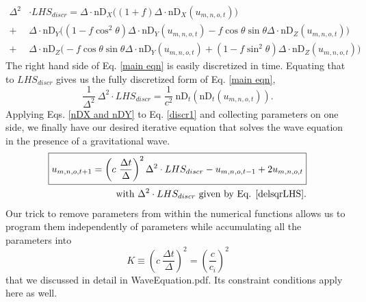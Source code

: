 \documentclass{article}
\begin{document}
\begin{align} \label{delsqrLHS}
\Delta^2 &\cdot LHS_{discr} = \Delta\cdot\mbox{nD}_X\big((1+f)\Delta\cdot\mbox{nD}_X(u_{m,n,o,t})\big) \\
+&\Delta \cdot\mbox{nD}_Y\big((1-f\cos^2\theta)\Delta\cdot\mbox{nD}_Y(u_{m,n,o,t})-f\cos\theta\sin\theta\Delta\cdot\mbox{nD}_Z(u_{m,n,o,t}) \big) \nonumber \\
+&\Delta \cdot\mbox{nD}_Z\big(-f\cos\theta\sin\theta\Delta\cdot\mbox{nD}_Y(u_{m,n,o,t}) + (1-f\sin^2\theta)\Delta\cdot\mbox{nD}_Z(u_{m,n,o,t})\big) \nonumber
\end{align}
The right hand side of Eq. \ref{main eqn} is easily discretized in time. Equating that to $LHS_{discr}$ gives us the fully discretized form of Eq. \ref{main eqn},
\begin{equation} \label{discr1}
\frac{1}{\Delta^2}\ \Delta^2 \cdot LHS_{discr} = \frac{1}{c^2}\ \mbox{nD}_t(\mbox{nD}_t(u_{m,n,o,t})).
\end{equation}
Applying Eqs. \ref{nDX and nDY} to Eq. \ref{discr1} and collecting parameters on one side, we finally have our desired iterative equation that solves the wave equation in the presence of a gravitational wave.
\begin{align} \label{discr main eqn}
\boxed{
u_{m,n,o,t+1}=\left(c\ \frac{\Delta t}{\Delta}\right)^2 \Delta^2 \cdot LHS_{discr}-u_{m,n,o,t-1}+2u_{m,n,o,t}
} \\
\text{with $\Delta^2 \cdot LHS_{discr}$ given by Eq. \ref{delsqrLHS}.} \nonumber
\end{align}
Our trick to remove parameters from within the numerical functions allows us to program them independently of parameters while accumulating all the parameters into
\begin{equation} \label{K}
K\equiv\left(c\ \frac{\Delta t}{\Delta}\right)^2=\left(\frac{c}{c_i}\right)^2
\end{equation}
that we discussed in detail in WaveEquation.pdf. Its constraint conditions apply here as well.
\end{document}
